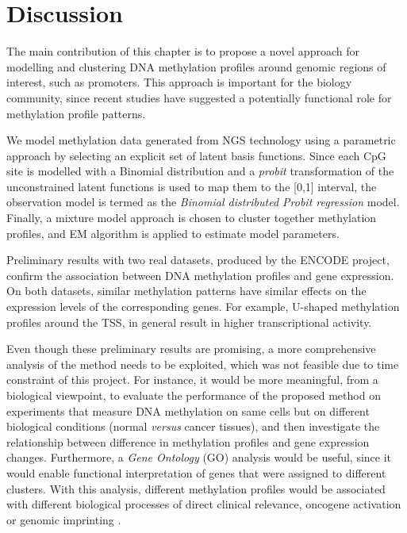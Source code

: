 \section{Discussion} \label{meth-discussion-sect}
The main contribution of this chapter is to propose a novel approach for modelling and clustering DNA methylation profiles around genomic regions of interest, such as promoters. This approach is important for the biology community, since recent studies have suggested a potentially functional role for methylation profile patterns.

We model methylation data generated from NGS technology using a parametric approach by selecting an explicit set of latent basis functions. Since each CpG site is modelled with a Binomial distribution and a \emph{probit} transformation of the unconstrained latent functions is used to map them to the [0,1] interval, the observation model is termed as the \emph{Binomial distributed Probit regression} model. Finally, a mixture model approach is chosen to cluster together methylation profiles, and EM algorithm is applied to estimate model parameters. 

Preliminary results with two real datasets, produced by the ENCODE project, confirm the association between DNA methylation profiles and gene expression. On both datasets, similar methylation patterns have similar effects on the expression levels of the corresponding genes. For example, U-shaped methylation profiles around the TSS, in general result in higher transcriptional activity. 

Even though these preliminary results are promising, a more comprehensive analysis of the method needs to be exploited, which was not feasible due to time constraint of this project. For instance, it would be more meaningful, from a biological viewpoint, to evaluate the performance of the proposed method on experiments that measure DNA methylation on same cells but on different biological conditions (\eg normal \emph{versus} cancer tissues), and then investigate the relationship between difference in methylation profiles and gene expression changes. Furthermore, a \emph{Gene Ontology} (GO) \citep{Ashburner2000} analysis would be useful, since it would enable functional interpretation of genes that were assigned to different clusters. With this analysis, different methylation profiles would be associated with different biological processes of direct clinical relevance, \eg oncogene activation or genomic imprinting \citep{Li1993}. 

